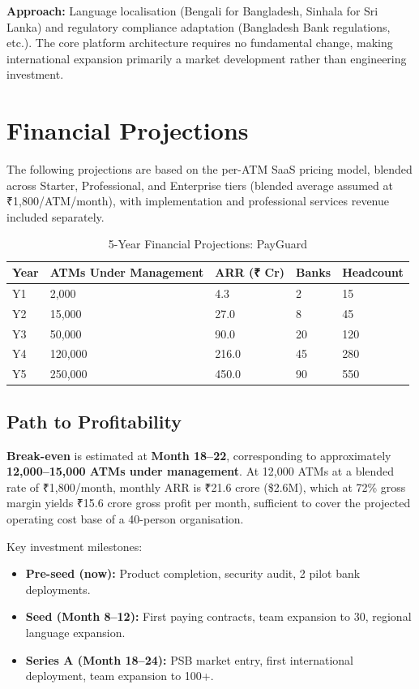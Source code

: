 \documentclass[12pt,a4paper]{article}
\newcommand{\inr}{₹}
\begin{document}
\textbf{Approach:} Language localisation (Bengali for Bangladesh, Sinhala for Sri Lanka) and
regulatory compliance adaptation (Bangladesh Bank regulations, etc.). The core platform
architecture requires no fundamental change, making international expansion primarily a
market development rather than engineering investment.

\newpage

\section{Financial Projections}

The following projections are based on the per-ATM SaaS pricing model, blended across
Starter, Professional, and Enterprise tiers (blended average assumed at \inr{}1,800/ATM/month),
with implementation and professional services revenue included separately.

\begin{table}[H]
\centering
\caption{5-Year Financial Projections: PayGuard}
\small
\begin{tabular}{@{}C{1.5cm} R{3.5cm} R{3.0cm} R{2.0cm} R{2.5cm}@{}}
\toprule
\textbf{Year} & \textbf{ATMs Under Management} & \textbf{ARR (\inr{} Cr)} & \textbf{Banks} & \textbf{Headcount} \\
\midrule
Y1 &   2,000 &   4.3 &  2 &  15 \\
Y2 &  15,000 &  27.0 &  8 &  45 \\
Y3 &  50,000 &  90.0 & 20 & 120 \\
Y4 & 120,000 & 216.0 & 45 & 280 \\
Y5 & 250,000 & 450.0 & 90 & 550 \\
\bottomrule
\end{tabular}
\end{table}

\subsection{Path to Profitability}

\textbf{Break-even} is estimated at \textbf{Month 18--22}, corresponding to approximately
\textbf{12,000--15,000 ATMs under management}. At 12,000 ATMs at a blended rate of
\inr{}1,800/month, monthly ARR is \inr{}21.6 crore (\$2.6M), which at 72\% gross margin
yields \inr{}15.6 crore gross profit per month, sufficient to cover the projected
operating cost base of a 40-person organisation.

Key investment milestones:
\begin{itemize}
  \item \textbf{Pre-seed (now):} Product completion, security audit, 2 pilot bank deployments.
  \item \textbf{Seed (Month 8--12):} First paying contracts, team expansion to 30, regional
        language expansion.
  \item \textbf{Series A (Month 18--24):} PSB market entry, first international deployment,
        team expansion to 100+.
\end{itemize}
\end{document}
